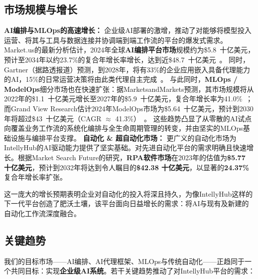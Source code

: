 \documentclass[11pt, a4paper, oneside]{article}
\begin{document}
\subsection{市场规模与增长}
\textbf{AI编排与MLOps的高速增长：} 企业级AI部署的激增，推动了对能够将模型投入运营、将其与工具与数据连接并协调端到端工作流的平台的爆发式需求。  
Market.us的最新分析估计，2024年全球\textbf{AI编排平台市场}规模约为\$5.8~十亿美元，预计至2034年以约23.7\%的复合年增长率增长，达到近\$48.7~十亿美元~\cite{AIOrch}。  
同时，Gartner（据路透报道）预测，到2028年，将有33\%的企业应用嵌入具备代理能力的AI，15\%的日常运营决策将由此类代理自主完成~\cite{GartnerAgentic}。  
与此同时，\textbf{MLOps / ModelOps}细分市场也在快速扩张：据MarketsandMarkets预测，其市场规模将从2022年的\$1.1~十亿美元增长至2027年的\$5.9~十亿美元，复合年增长率为41.0\%~\cite{MLOpsMM}；而Grand View Research估计2024年ModelOps市场为\$5.64~十亿美元，预计到2030年将超过\$43~十亿美元（CAGR $\approx$ 41.3\%）~\cite{ModelOpsGV}。  
这些趋势凸显了从零散的AI试点向覆盖业务工作流的系统化编排与全生命周期管理的转变，并由坚实的MLOps基础设施与编排平台支撑。\newline\newline
\textbf{自动化 \& 超自动化市场：} 更广义的自动化市场为IntellyHub的AI驱动能力提供了坚实基础。对先进自动化平台的需求明确且快速增长。根据Market Search Future的研究，\textbf{RPA软件市场}在2023年的估值为\textbf{\$5.77 十亿美元}，预计到2032年将达到令人瞩目的\textbf{\$42.38 十亿美元}，以显著的\textbf{24.37\%}复合年增长率扩张\cite{mrfRPA}。

这一庞大的增长预期表明企业对自动化的投入将深且持久，为像IntellyHub这样的下一代平台创造了肥沃土壤，该平台面向日益增长的需求：将AI与现有及新建的自动化工作流深度融合。

\subsection{关键趋势}
我们的目标市场——AI编排、AI代理框架、MLOps与传统自动化——正趋同于一个共同目标：实现\textbf{企业级AI系统}。若干关键趋势推动了对IntellyHub平台的需求：
\end{document}
